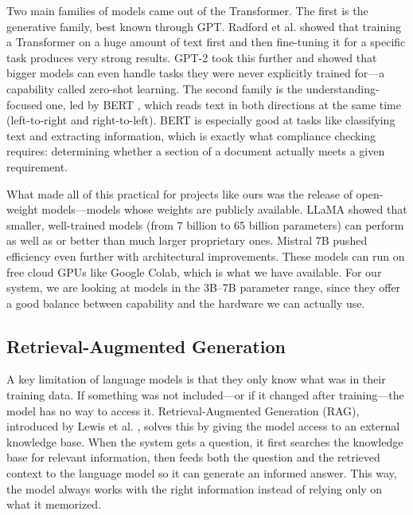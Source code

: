 \documentclass[conference]{IEEEtran}
\begin{document}
Two main families of models came out of the Transformer. The first is the generative family, best known through GPT. Radford et al. \cite{radford2018gpt1} showed that training a Transformer on a huge amount of text first and then fine-tuning it for a specific task produces very strong results. GPT-2 \cite{radford2019gpt2} took this further and showed that bigger models can even handle tasks they were never explicitly trained for---a capability called zero-shot learning. The second family is the understanding-focused one, led by BERT \cite{devlin2019bert}, which reads text in both directions at the same time (left-to-right and right-to-left). BERT is especially good at tasks like classifying text and extracting information, which is exactly what compliance checking requires: determining whether a section of a document actually meets a given requirement.

What made all of this practical for projects like ours was the release of open-weight models---models whose weights are publicly available. LLaMA \cite{touvron2023llama} showed that smaller, well-trained models (from 7 billion to 65 billion parameters) can perform as well as or better than much larger proprietary ones. Mistral 7B \cite{jiang2023mistral} pushed efficiency even further with architectural improvements. These models can run on free cloud GPUs like Google Colab, which is what we have available. For our system, we are looking at models in the 3B--7B parameter range, since they offer a good balance between capability and the hardware we can actually use.

\subsection{Retrieval-Augmented Generation}

A key limitation of language models is that they only know what was in their training data. If something was not included---or if it changed after training---the model has no way to access it. Retrieval-Augmented Generation (RAG), introduced by Lewis et al. \cite{lewis2020rag}, solves this by giving the model access to an external knowledge base. When the system gets a question, it first searches the knowledge base for relevant information, then feeds both the question and the retrieved context to the language model so it can generate an informed answer. This way, the model always works with the right information instead of relying only on what it memorized.
\end{document}
